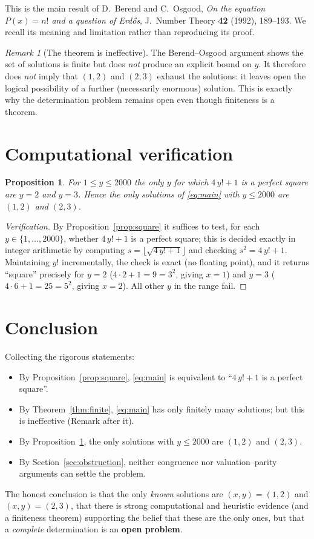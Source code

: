 \documentclass{amsart}
\theoremstyle{plain}
\newtheorem{proposition}{Proposition}
\theoremstyle{remark}
\newtheorem{remark}{Remark}
\begin{document}
This is the main result of D.~Berend and C.~Osgood, \emph{On the equation
$P(x)=n!$ and a question of Erd\H{o}s}, J.\ Number Theory \textbf{42}
(1992), 189--193.  We recall its meaning and limitation rather than
reproducing its proof.

\begin{remark}[The theorem is ineffective]
The Berend--Osgood argument shows the set of solutions is finite but does
\emph{not} produce an explicit bound on $y$.  It therefore does \emph{not}
imply that $(1,2)$ and $(2,3)$ exhaust the solutions: it leaves open the
logical possibility of a further (necessarily enormous) solution.  This is
exactly why the determination problem remains open even though finiteness
is a theorem.
\end{remark}

\section{Computational verification}\label{sec:comput}

\begin{proposition}\label{prop:comp}
For $1\le y\le 2000$ the only $y$ for which $4\,y!+1$ is a perfect square
are $y=2$ and $y=3$.  Hence the only solutions of \eqref{eq:main} with
$y\le 2000$ are $(1,2)$ and $(2,3)$.
\end{proposition}

\begin{proof}[Verification]
By Proposition~\ref{prop:square} it suffices to test, for each
$y\in\{1,\dots,2000\}$, whether $4\,y!+1$ is a perfect square; this is
decided exactly in integer arithmetic by computing
$s=\lfloor\sqrt{4\,y!+1}\rfloor$ and checking $s^2=4\,y!+1$.  Maintaining
$y!$ incrementally, the check is exact (no floating point), and it returns
``square'' precisely for $y=2$ ($4\cdot 2+1=9=3^2$, giving $x=1$) and
$y=3$ ($4\cdot 6+1=25=5^2$, giving $x=2$).  All other $y$ in the range fail.
\end{proof}

\section{Conclusion}

Collecting the rigorous statements:
\begin{itemize}
\item By Proposition~\ref{prop:square}, \eqref{eq:main} is equivalent to
``$4\,y!+1$ is a perfect square''.
\item By Theorem~\ref{thm:finite}, \eqref{eq:main} has only finitely many
solutions; but this is ineffective (Remark after it).
\item By Proposition~\ref{prop:comp}, the only solutions with $y\le 2000$
are $(1,2)$ and $(2,3)$.
\item By Section~\ref{sec:obstruction}, neither congruence nor
valuation--parity arguments can settle the problem.
\end{itemize}
The honest conclusion is that the only \emph{known} solutions are
$(x,y)=(1,2)$ and $(x,y)=(2,3)$, that there is strong computational and
heuristic evidence (and a finiteness theorem) supporting the belief that
these are the only ones, but that a \emph{complete} determination is an
\textbf{open problem}.
\end{document}
